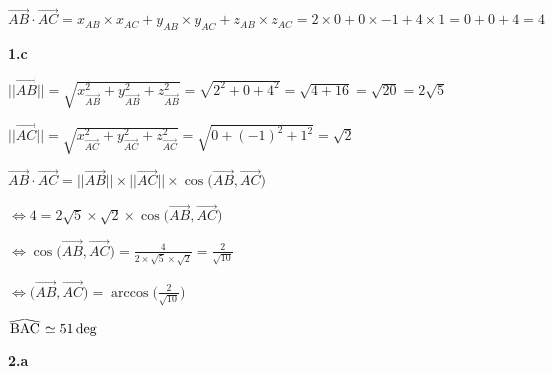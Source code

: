 \documentclass{article}
\newcommand\reallywidehat[1]{%
\savestack{\tmpbox}{\stretchto{%
  \scaleto{%
    \scalerel*[\widthof{\ensuremath{#1}}]{\kern-.6pt\bigwedge\kern-.6pt}%
    {\rule[-\textheight/2]{1ex}{\textheight}}%
  }{\textheight}%
}{0.5ex}}%
\stackon[1pt]{#1}{\tmpbox}%
}
\begin{document}
\vspace{2mm}

\noindent $\overrightarrow{AB} \cdot \overrightarrow{AC} = x_{AB} \times x_{AC} + y_{AB} \times y_{AC} + z_{AB} \times z_{AC} = 2\times0 + 0\times-1 + 4\times1 = 0 + 0 + 4 = 4$

\vspace{2mm}

\textbf{1.c}

\vspace{2mm}

\noindent $||\overrightarrow{AB}|| = \displaystyle\sqrt{x_{\overrightarrow{AB}}^2 + y_{\overrightarrow{AB}}^2 + z_{\overrightarrow{AB}}^2} = \sqrt{2^2+0+4^2} = \sqrt{4+16} = \sqrt{20} = 2\sqrt{5}$

\vspace{2mm}

\noindent $||\overrightarrow{AC}|| = \displaystyle\sqrt{x_{\overrightarrow{AC}}^2 + y_{\overrightarrow{AC}}^2 + z_{\overrightarrow{AC}}^2} = \sqrt{0+(-1)^2+1^2} = \sqrt{2}$

\vspace{2mm}
\noindent $\overrightarrow{AB} \cdot \overrightarrow{AC} = ||\overrightarrow{AB}|| \times ||\overrightarrow{AC}|| \times \cos\Big(\overrightarrow{AB}, \overrightarrow{AC}\Big)$

\vspace{2mm}

$\Leftrightarrow 4 = 2\sqrt{5} \times \sqrt{2} \times \cos\Big(\overrightarrow{AB}, \overrightarrow{AC}\Big)$

\vspace{2mm}

$\Leftrightarrow \cos\Big(\overrightarrow{AB}, \overrightarrow{AC}\Big) = \displaystyle\frac{4}{2\times \sqrt{5} \times \sqrt{2}} = \displaystyle\frac{2}{\sqrt{10}}$

\vspace{2mm}

$\Leftrightarrow \Big(\overrightarrow{AB}, \overrightarrow{AC}\Big) = \arccos\Bigg({\displaystyle\frac{2}{\sqrt{10}}}\Bigg)$

\vspace{2mm}

\noindent $\reallywidehat{BAC} \simeq 51 \deg$


\vspace{2mm}

\textbf{2.a}

\vspace{2mm}
\end{document}
